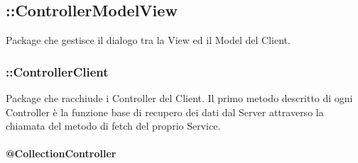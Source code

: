 \subsection{::ControllerModelView}
Package che gestisce il dialogo tra la View ed il Model del Client.

\subsubsection{::ControllerClient}
Package che racchiude i Controller del Client. Il primo metodo descritto di ogni Controller è la funzione base di recupero dei dati dal Server attraverso la chiamata del metodo di fetch del proprio Service.

\paragraph{@CollectionController}
